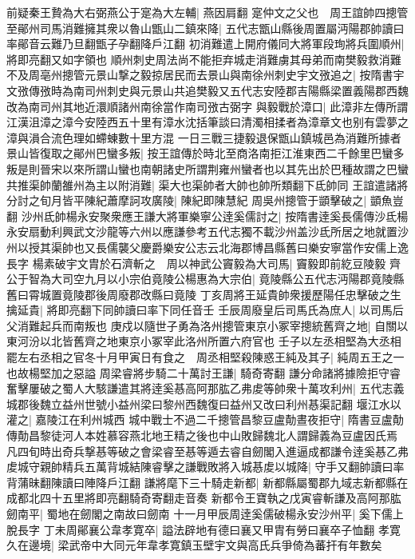 前疑秦王贄為大右弼燕公于寔為大左輔|{
	燕因肩翻}
寔仲文之父也　周王誼帥四摠管至鄖州司馬消難擁其衆以魯山甑山二鎮來降|{
	五代志甑山縣後周置屬沔陽郡帥讀曰率鄖音云難乃旦翻甑子孕翻降戶江翻}
初消難遣上開府儀同大將軍段珣將兵圍順州|{
	將即亮翻又如字領也}
順州刺史周法尚不能拒弃城走消難虜其母弟而南樊毅救消難不及周亳州摠管元景山撃之毅掠居民而去景山與南徐州刺史宇文㢸追之|{
	按隋書宇文㢸傳㢸時為南司州刺史與元景山共追樊毅又五代志安陸郡吉陽縣梁置義陽郡西魏改為南司州其地近澴順諸州南徐當作南司㢸古弼字}
與毅戰於漳口|{
	此漳非左傳所謂江漢沮漳之漳今安陸西五十里有漳水沈括筆談曰清濁相揉者為漳章文也别有雲夢之漳與溳合流色理如螮蝀數十里方混}
一日三戰三捷毅退保甑山鎮城邑為消難所據者景山皆復取之鄖州巴蠻多叛|{
	按王誼傳於時北至商洛南拒江淮東西二千餘里巴蠻多叛是則晉宋以來所謂山蠻也南朝諸史所謂荆雍州蠻者也以其先出於巴種故謂之巴蠻}
共推渠帥蘭雒州為主以附消難|{
	渠大也渠帥者大帥也帥所類翻下氐帥同}
王誼遣諸將分討之旬月皆平陳紀蕭摩訶攻廣陵|{
	陳紀即陳慧紀}
周吳州摠管于顗擊破之|{
	顗魚豈翻}
沙州氐帥楊永安聚衆應王謙大將軍樂寧公逹奚儒討之|{
	按隋書逹奚長儒傳沙氐楊永安扇動利興武文沙龍等六州以應謙參考五代志獨不載沙州盖沙氐所居之地就置沙州以授其渠帥也又長儒襲父慶爵樂安公志云北海郡博昌縣舊曰樂安寧當作安儒上逸長字}
楊素破宇文胄於石濟斬之　周以神武公竇毅為大司馬|{
	竇毅即前紇豆陵毅}
齊公于智為大司空九月以小宗伯竟陵公楊惠為大宗伯|{
	竟陵縣公五代志沔陽郡竟陵縣舊曰霄城置竟陵郡後周廢郡改縣曰竟陵}
丁亥周將王延貴帥衆援歷陽任忠擊破之生擒延貴|{
	將即亮翻下同帥讀曰率下同任音壬}
壬辰周廢皇后司馬氏為庶人|{
	以司馬后父消難起兵而南叛也}
庚戍以隨世子勇為洛州摠管東京小冢宰摠統舊齊之地|{
	自關以東河汾以北皆舊齊之地東京小冢宰此洛州所置六府官也}
壬子以左丞相堅為大丞相罷左右丞相之官冬十月甲寅日有食之　周丞相堅殺陳惑王純及其子|{
	純周五王之一也故楊堅加之惡謚}
周梁睿將步騎二十萬討王謙|{
	騎奇寄翻}
謙分命諸將據險拒守睿奮擊屢破之蜀人大駭謙遣其將逹奚惎高阿那肱乙弗䖍等帥衆十萬攻利州|{
	五代志義城郡後魏立益州世號小益州梁曰黎州西魏復曰益州又改曰利州惎渠記翻}
堰江水以灌之|{
	嘉陵江在利州城西}
城中戰士不過二千摠管昌黎豆盧勣晝夜拒守|{
	隋書豆盧勣傳勣昌黎徒河人本姓慕容燕北地王精之後也中山敗歸魏北人謂歸義為豆盧因氏焉}
凡四旬時出奇兵撃惎等破之會梁睿至惎等遁去睿自劒閣入進逼成都謙令逹奚惎乙弗䖍城守親帥精兵五萬背城結陳睿擊之謙戰敗將入城惎䖍以城降|{
	守手又翻帥讀曰率背蒲昧翻陳讀曰陣降戶江翻}
謙將麾下三十騎走新都|{
	新都縣屬蜀郡九域志新都縣在成都北四十五里將即亮翻騎奇寄翻走音奏}
新都令王寶執之戊寅睿斬謙及高阿那肱劒南平|{
	蜀地在劒閣之南故曰劒南}
十一月甲辰周逹奚儒破楊永安沙州平|{
	奚下儒上脫長字}
丁未周鄖襄公韋孝寛卒|{
	謚法辟地有德曰襄又甲胄有勞曰襄卒子恤翻}
孝寛久在邊境|{
	梁武帝中大同元年韋孝寛鎮玉壁宇文與高氏兵爭倚為蕃扞有年數矣}
